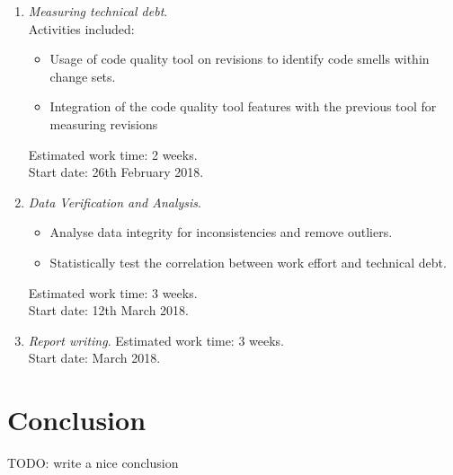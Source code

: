 \documentclass{mprop}
\begin{document}
\begin{enumerate}
	\item \textit{Measuring technical debt}.\\
	Activities included:
	\begin{itemize}
		\item Usage of code quality tool on revisions to identify code smells
		within change sets.
		\item Integration of the code quality tool features with the previous
		tool for measuring revisions 
	\end{itemize}

	Estimated work time: 2 weeks.\\
	Start date: 26th February 2018.

	\item \textit{Data Verification and Analysis}.\\
	\begin{itemize}
		\item Analyse data integrity for inconsistencies and remove outliers.
		\item Statistically test the correlation between work effort and technical debt.
	\end{itemize}

	Estimated work time: 3 weeks.\\
	Start date: 12th March 2018.

	\item \textit{Report writing}.
	Estimated work time: 3 weeks.\\
	Start date:  March 2018.
\end{enumerate}


\section{Conclusion}

TODO: write a nice conclusion

\pagebreak


\end{document}
